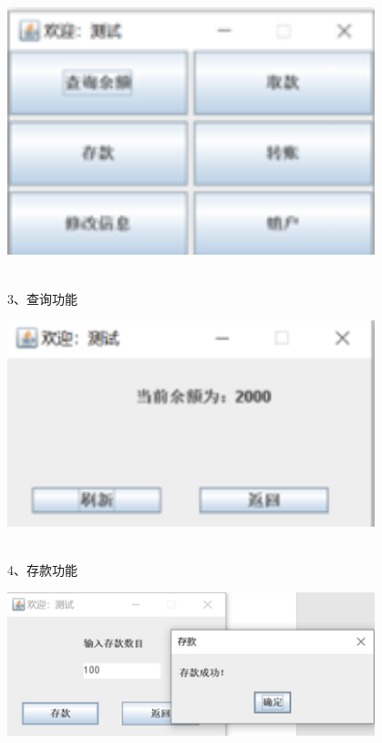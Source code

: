 \begin{centering}
	\centering
	\includegraphics[width=0.8\textwidth]{figure/图6}
	\label{fig:example}
\end{centering}\\
3、查询功能\\
\begin{centering}
	\centering
	\includegraphics[width=0.8\textwidth]{figure/图7}
	\label{fig:example}
\end{centering}\\
4、存款功能\\
\begin{centering}
	\centering
	\includegraphics[width=0.8\textwidth]{figure/图8}
	\label{fig:example}
\end{centering}\\
